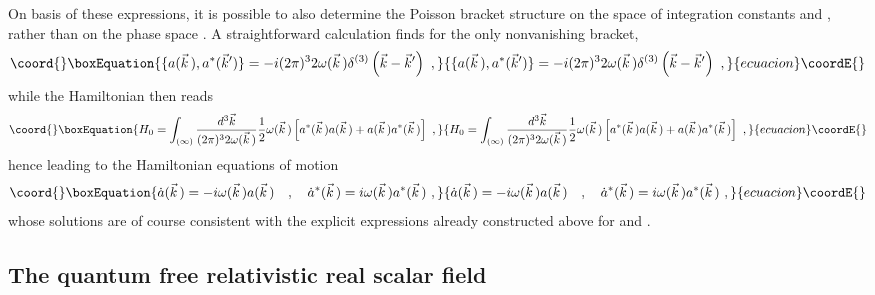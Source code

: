 \documentclass[a4paper,11pt]{article}
\begin{document}
On basis of these expressions, it is possible to also determine the Poisson
bracket structure on the space of integration constants \coordHE{}
and \coordHE{}, rather than on the phase space 
\coordHE{}. A straightforward
calculation finds for the only nonvanishing bracket,
\begin{equation}\coord{}\boxEquation{
\{a(\vec{k}\,),a^*(\vec{k}')\}=-i(2\pi)^32\omega(\vec{k}\,)
\delta^{(3)}\left(\vec{k}-\vec{k}'\right)\ ,
}{
\{a(\vec{k}\,),a^*(\vec{k}')\}=-i(2\pi)^32\omega(\vec{k}\,)
\delta^{(3)}\left(\vec{k}-\vec{k}'\right)\ ,
}{ecuacion}\coordE{}\end{equation}
while the Hamiltonian then reads
\begin{equation}\coord{}\boxEquation{
H_0=\int_{(\infty)}\frac{d^3\vec{k}}{(2\pi)^32\omega(\vec{k}\,)}
\frac{1}{2}\omega(\vec{k}\,)\left[a^*(\vec{k}\,)a(\vec{k}\,)+
a(\vec{k}\,)a^*(\vec{k}\,)\right]\ ,
}{
H_0=\int_{(\infty)}\frac{d^3\vec{k}}{(2\pi)^32\omega(\vec{k}\,)}
\frac{1}{2}\omega(\vec{k}\,)\left[a^*(\vec{k}\,)a(\vec{k}\,)+
a(\vec{k}\,)a^*(\vec{k}\,)\right]\ ,
}{ecuacion}\coordE{}\end{equation}
hence leading to the Hamiltonian equations of motion
\begin{equation}\coord{}\boxEquation{
\dot{a}(\vec{k}\,)=-i\omega(\vec{k}\,)a(\vec{k}\,)\ \ \ ,\ \ \ 
\dot{a}^*(\vec{k}\,)=i\omega(\vec{k}\,)a^*(\vec{k}\,)\ ,
}{
\dot{a}(\vec{k}\,)=-i\omega(\vec{k}\,)a(\vec{k}\,)\ \ \ ,\ \ \ 
\dot{a}^*(\vec{k}\,)=i\omega(\vec{k}\,)a^*(\vec{k}\,)\ ,
}{ecuacion}\coordE{}\end{equation}
whose solutions are of course consistent with the explicit expressions
already constructed above for \coordHE{} and \coordHE{}.

\subsection{The quantum free relativistic real scalar field}
\label{Subsect3.3}
\end{document}

